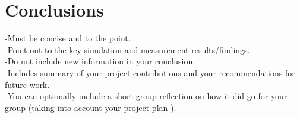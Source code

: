 \chapter{Conclusions} 

-Must be concise and to the point.\\
-Point out to the key simulation and measurement results/findings.\\
-Do not include new information in your conclusion.\\
-Includes summary of your project contributions and your recommendations for future work.\\
-You can optionally include a short group reflection on how it did go for your group (taking into account your project plan \cite{Grit}). 

